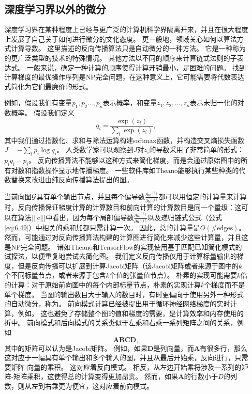   
\subsection{深度学习界以外的微分}
\label{sec:differentiation_outside_the_deep_learning_community}

深度学习界在某种程度上已经与更广泛的计算机科学界隔离开来，并且在很大程度上发展了自己关于如何进行微分的文化态度。
更一般地，领域关心如何以算法方式计算导数。 
这里描述的反向传播算法只是自动微分的一种方法。 
它是一种称为的更广泛类型的技术的特殊情况。 
其他方法以不同的顺序来计算链式法则的子表达式。 
一般来说，确定一种计算的顺序使得计算开销最小，是困难的问题。 
找到计算梯度的最优操作序列是NP完全问题\citep{naumann2008optimal}，在这种意义上，它可能需要将代数表达式简化为它们最廉价的形式。

例如，假设我们有变量$p_1,p_2\ldots,p_n$表示概率，和变量$z_1,z_2,\ldots,z_n$表示未归一化的对数概率。
假设我们定义
\begin{equation}
  q_i = \frac{\exp(z_i)}{\sum_i \exp(z_i)},
\end{equation}
其中我们通过指数化、求和与除法运算构建softmax函数，并构造交叉熵损失函数$J=-\sum_i p_i\log q_i$。
人类数学家可以观察到$J$对$z_i$的导数采用了非常简单的形式：$p_iq_i-p_i$。
反向传播算法不能够以这种方式来简化梯度，而是会通过原始图中的所有对数和指数操作显示地传播梯度。
一些软件库如Theano\citep{bergstra+al:2010-scipy-small,Bastien-Theano-2012}能够执行某些种类的代数替换来改进由纯反向传播算法提出的图。
  
  
当前向图$\mathcal{G}$具有单个输出节点，并且每个偏导数$\frac{\partial u^{(i)}}{\partial u^{(j)}}$都可以用恒定的计算量来计算时，反向传播保证梯度计算的计算数目和前向计算的计算数目是同一个量级：这可以在算法|||c|||中看出，因为每个局部偏导数$\frac{\partial u^{(i)}}{\partial u^{(j)}}$以及递归链式公式（公式\ref{eq:6.49}）中相关的乘和加都只需计算一次。
因此，总的计算量是$O(\#\text{edges})$。
然而，可能通过对反向传播算法构建的计算图进行简化来减少这些计算量，并且这是NP完全问题。
诸如Theano和TensorFlow的实现使用基于匹配已知简化模式的试探法，以便重复地尝试去简化图。
我们定义反向传播仅用于计算标量输出的梯度，但是反向传播可以扩展到计算Jacobi矩阵（该Jacobi矩阵或者来源于图中的$k$个不同标量节点，或者来源于包含$k$个值的张量值节点）。
朴素的实现可能需要$k$倍的计算：对于原始前向图中的每个内部标量节点，朴素的实现计算$k$个梯度而不是单个梯度。
当图的输出数目大于输入的数目时，有时更偏向于使用另外一种形式的自动微分，称为。
前向模式计算已经被提出用于循环神经网络梯度的实时计算，例如\citep{Williams89b}。
这也避免了存储整个图的值和梯度的需要，是计算效率和内存使用的折中。
前向模式和后向模式的关系类似于左乘和右乘一系列矩阵之间的关系，例如
\begin{equation}
  \bm{ABCD},
\end{equation}
其中的矩阵可以认为是Jacobi矩阵。
例如，如果$\bm{D}$是列向量，而$\bm{A}$有很多行，那么这对应于一幅具有单个输出和多个输入的图，并且从最后开始乘，反向进行，只需要矩阵-向量的乘积。
这对应着反向模式。
相反，从左边开始乘将涉及一系列的矩阵-矩阵乘积，这使得总的计算变得更加昂贵。
然而，如果$\bm{A}$的行数小于$D$的列数，则从左到右乘更为便宜，这对应着前向模式。

